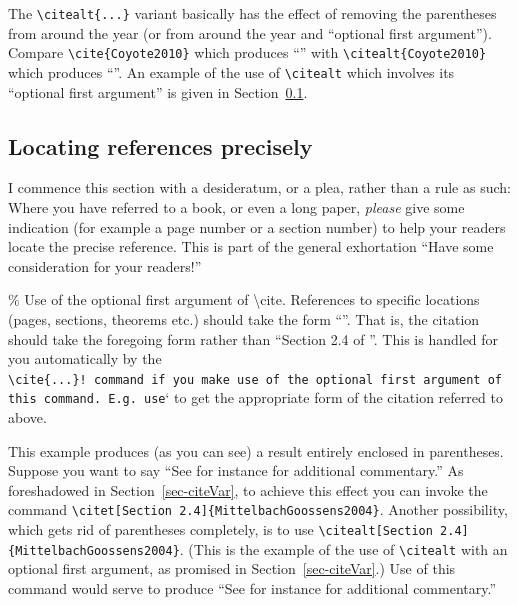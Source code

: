 \documentclass[
  times,
  doublespace]{anzsauth}
\begin{document}
The \texttt{\textbackslash{}citealt\{...\}} variant basically has the
effect of removing the parentheses from around the year (or from around
the year and ``optional first argument''). Compare
\texttt{\textbackslash{}cite\{Coyote2010\}} which produces
``\cite{Coyote2010}'' with
\texttt{\textbackslash{}citealt\{Coyote2010\}} which produces
``\citealt{Coyote2010}''. An example of the use of
\texttt{\textbackslash{}citealt} which involves its ``optional first
argument'' is given in Section~\ref{sec-locPrecise}.

\subsection{Locating references precisely}\label{sec-locPrecise}

I commence this section with a desideratum, or a plea, rather than a
rule as such: Where you have referred to a book, or even a long paper,
\emph{please} give some indication (for example a page number or a
section number) to help your readers locate the precise reference. This
is part of the general exhortation ``Have some consideration for your
readers!''

\% Use of the optional first argument of \textbackslash cite. References
to specific locations (pages, sections, theorems etc.) should take the
form ``\cite[Section 2.4]{MittelbachGoossens2004}''. That is, the
citation should take the foregoing form rather than ``Section 2.4 of
\cite{MittelbachGoossens2004}''. This is handled for you automatically
by the
\texttt{\textbackslash{}cite\{...\}!\ command\ if\ you\ make\ use\ of\ the\ optional\ first\ argument\ of\ this\ command.\ E.g.\ use}\cite[Section 2.4]{MittelbachGoossens2004}`
to get the appropriate form of the citation referred to above.

This example produces (as you can see) a result entirely enclosed in
parentheses. Suppose you want to say ``See for instance
\citet[Section 2.4]{MittelbachGoossens2004} for additional commentary.''
As foreshadowed in Section~\ref{sec-citeVar}, to achieve this effect you
can invoke the command
\texttt{\textbackslash{}citet{[}Section\ 2.4{]}\{MittelbachGoossens2004\}}.
Another possibility, which gets rid of parentheses completely, is to use
\texttt{\textbackslash{}citealt{[}Section\ 2.4{]}\{MittelbachGoossens2004\}}.
(This is the example of the use of \texttt{\textbackslash{}citealt} with
an optional first argument, as promised in Section~\ref{sec-citeVar}.)
Use of this command would serve to produce ``See for instance
\citealt[Section
2.4]{MittelbachGoossens2004} for additional commentary.''
\end{document}
